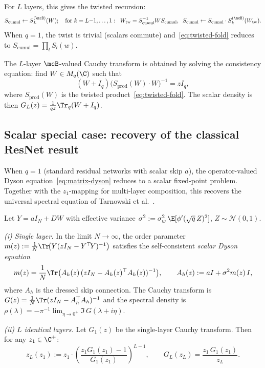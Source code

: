 \noindent For $L$ layers, this gives the twisted recursion:
\begin{equation}\label{eq:twisted-fold}
S_{\mathrm{cumul}} \leftarrow S^{(\mcB)}_L(W); \quad \text{for } k = L{-}1, \ldots, 1: \;\; W_{\mathrm{tw}} = S_{\mathrm{cumul}}^{-1} W S_{\mathrm{cumul}}, \;\; S_{\mathrm{cumul}} \leftarrow S_{\mathrm{cumul}} \cdot S^{(\mcB)}_k(W_{\mathrm{tw}}).
\end{equation}
When $q = 1$, the twist is trivial (scalars commute) and~\eqref{eq:twisted-fold} reduces to $S_{\mathrm{cumul}} = \prod_l S_l(w)$.

The $L$-layer $\mcB$-valued Cauchy transform is obtained by solving the consistency equation: find $W \in M_q(\C)$ such that
\begin{equation}\label{eq:outer-consistency}
(W + I_q)\bigl(S_{\mathrm{prod}}(W) \cdot W\bigr)^{-1} = z I_q,
\end{equation}
where $S_{\mathrm{prod}}(W)$ is the twisted product~\eqref{eq:twisted-fold}. The scalar density is then $G_L(z) = \frac{1}{qz}\Tr_q(W + I_q)$.

\subsection{Scalar special case: recovery of the classical ResNet result}\label{app:scalar-recovery}

When $q = 1$ (standard residual networks with scalar skip $a$), the operator-valued Dyson equation~\eqref{eq:matrix-dyson} reduces to a scalar fixed-point problem. Together with the $z_1$-mapping for multi-layer composition, this recovers the universal spectral equation of Tarnowski et al.~\cite{tarnowski2019dynamical}.

\begin{proposition}\label{prop:scalar-dyson}
Let $Y = aI_N + DW$ with effective variance $\sigma^2 := \sigma_w^2\,\E[\phi'(\sqrt{q}\,Z)^2]$, $Z \sim \mathcal{N}(0,1)$.

\noindent\emph{(i) Single layer.} In the limit $N \to \infty$, the order parameter $m(z) := \frac{1}{N}\Tr\!\bigl(Y(zI_N - Y^\top\! Y)^{-1}\bigr)$ satisfies the self-consistent \emph{scalar Dyson equation}\label{app:dyson-derivation}
\begin{equation}\label{eq:dyson-fp}
m(z) = \frac{1}{N}\Tr\bigl(A_h(z)\,(zI_N - A_h(z)^\top A_h(z))^{-1}\bigr), \qquad A_h(z) := aI + \sigma^2 m(z)\, I,
\end{equation}
where $A_h$ is the dressed skip connection. The Cauchy transform is $G(z) = \frac{1}{N}\Tr(zI_N - A_h^\top A_h)^{-1}$ and the spectral density is $\rho(\lambda) = -\pi^{-1}\lim_{\eta \to 0^+}\!\Im\, G(\lambda + i\eta)$.

\noindent\emph{(ii) $L$ identical layers.}\label{prop:z1-mapping} Let $G_1(z)$ be the single-layer Cauchy transform. Then for any $z_1 \in \C^+$:
\begin{equation}\label{eq:z1-to-zL}
z_L(z_1) := z_1 \cdot \left(\frac{z_1 G_1(z_1) - 1}{G_1(z_1)}\right)^{L-1}, \qquad
G_L(z_L) = \frac{z_1 \, G_1(z_1)}{z_L}.
\end{equation}
\end{proposition}

